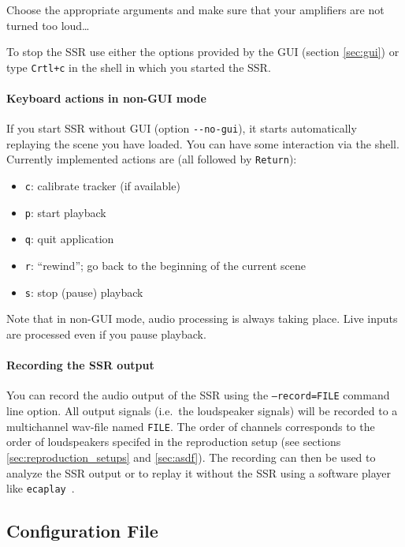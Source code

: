 Choose the appropriate arguments and make sure that your amplifiers
are not turned too loud\dots

To stop the SSR use either the options provided by the GUI (section
\ref{sec:gui}) or type \texttt{Crtl+c} in the shell in which you started the
SSR.

\paragraph{Keyboard actions in non-GUI mode}

If you start SSR without GUI (option \verb+--no-gui+), it starts automatically
replaying the scene you have loaded. You can have some interaction via the
shell. Currently implemented actions are (all followed by \texttt{Return}):

\begin{itemize}
\item[] \texttt{c}: calibrate tracker (if available)
\item[] \texttt{p}: start playback
\item[] \texttt{q}: quit application
\item[] \texttt{r}: ``rewind''; go back to the beginning of the current scene
\item[] \texttt{s}: stop (pause) playback
\end{itemize}
%
Note that in non-GUI mode, audio processing is always taking place. Live inputs
are processed even if you pause playback.

\paragraph{Recording the SSR output}

You can record the audio output of the SSR using the \texttt{--record=FILE} command
line option. All output signals (i.e.\ the loudspeaker signals) will be recorded
to a multichannel wav-file named \texttt{FILE}. The order of channels
corresponds to the order of loudspeakers specifed in the reproduction setup
(see sections \ref{sec:reproduction_setups} and \ref{sec:asdf}). The recording
can then be used to analyze the SSR output or to replay it without the SSR
using a software player like \texttt{ecaplay}~\cite{ecasound}.

\subsection{Configuration File}
\label{sec:ssr_configuration_file}

